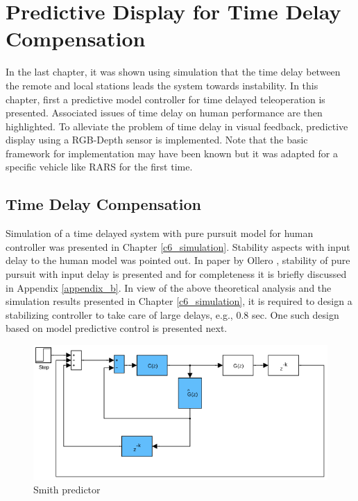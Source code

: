 \chapter{ Predictive Display for Time Delay Compensation}
\label{ch_7:PDsply}
In the last chapter, it was shown using simulation that the time delay between the remote and local stations leads the system towards instability. In this chapter, first a predictive model controller for time delayed teleoperation is presented. Associated issues of time delay on human performance are then highlighted. To alleviate the problem of time delay in visual feedback, predictive display using a RGB-Depth sensor is  implemented. Note that the basic framework for implementation may have been known but it was adapted for a specific vehicle like RARS for the first time. 

\section {Time Delay Compensation}
Simulation of a time delayed system with pure pursuit model for human controller was presented in Chapter \ref{c6_simulation}.  Stability aspects with input delay to the human model was pointed out. In paper by Ollero \cite{ollero1995stability}, stability of pure pursuit with input delay is presented and for completeness it is briefly discussed in Appendix \ref{appendix_b}.   In view of the above theoretical analysis and the simulation results presented in Chapter \ref{c6_simulation}, it is required to design  a stabilizing controller to take care of large delays, e.g.,  0.8 sec. One such design based on model  predictive control is presented next.

 \begin{figure}
 	\includegraphics[width=\linewidth]{Chapter7/fig/Smith_predictor}
 	\caption{Smith predictor \cite{smith1959controller}}
 	\label{fig:Smith}
 \end{figure}
 
